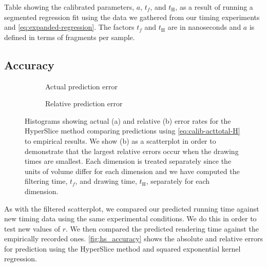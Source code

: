 \begin{table}[h]
\centering
\caption{
  Table showing the calibrated parameters, $a$, $t_f$, and $t_\text{H}$,
  as a result of running a segmented regression fit using the data we gathered
  from our timing experiments and \autoref{eq:expanded-regression}.
  The factors $t_f$ and $t_\text{H}$ are in nanoseconds and $a$ is defined
  in terms of fragments per sample.
}

\label{tbl:model_fits}
\end{table}

\subsection{Accuracy}
 
\begin{figure*}[t]
  \centering
  \begin{subfigure}{0.5\textwidth}
    
    \caption{Actual prediction error}
    \label{fig:hs_abs_error}
  \end{subfigure}%
  \begin{subfigure}{0.5\textwidth}
    
    \caption{Relative prediction error}
    \label{fig:hs_rel_error}
  \end{subfigure}
  \caption{%
    Histograms showing actual (a) and relative (b) error rates
    for the HyperSlice method
    comparing predictions using \autoref{eq:calib-acttotal-H} to empirical 
    results.  We show (b) as a scatterplot in order to demonstrate that
    the largest relative errors occur when the drawing times are 
    smallest.
    Each dimension is treated separately since the units of volume differ
    for each dimension and we have computed the filtering time, $t_f$,
    and drawing time, $t_\text{H}$, separately for each dimension.
  }
  \label{fig:hs_accuracy}
\end{figure*}

As with the filtered scatterplot, we compared our predicted running time
against new timing data using the same experimental conditions.  We do this
in order to test new values of $r$.  We then compared the predicted 
rendering time against the empirically recorded ones. 
\autoref{fig:hs_accuracy} shows the absolute and relative
errors for prediction using the HyperSlice method and squared exponential 
kernel regression.

